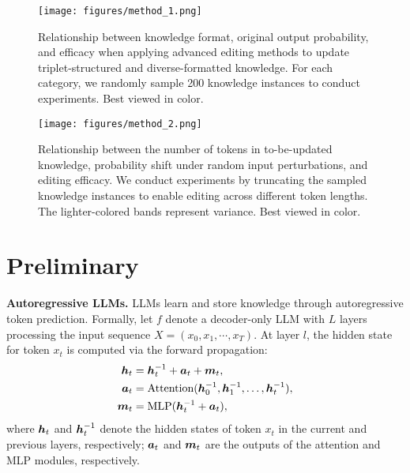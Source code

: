 
\begin{figure*}[t]
    \centering
    \begin{minipage}[t]{0.47\textwidth}
        \centering
        \texttt{[image: figures/method\_1.png]}
        \vspace{-10pt}
        \caption{Relationship between knowledge format, original output probability, and efficacy when applying advanced editing methods to update triplet-structured and diverse-formatted knowledge. For each category, we randomly sample 200 knowledge instances to conduct experiments. Best viewed in color.}
        \label{fig:method1}
        \vspace{-10pt}
    \end{minipage}%
    \hfill
    \begin{minipage}[t]{0.473\textwidth}
        \centering
        \texttt{[image: figures/method\_2.png]}
        \vspace{-10pt}
        \caption{Relationship between the number of tokens in to-be-updated knowledge, probability shift under random input perturbations, and editing efficacy. We conduct experiments by truncating the sampled knowledge instances to enable editing across different token lengths. The lighter-colored bands represent variance. Best viewed in color.}
        \label{fig:method2}
        \vspace{-10pt}
    \end{minipage}
\end{figure*}

\section{Preliminary} \label{sec:method:pre}
\textbf{Autoregressive LLMs.}
LLMs learn and store knowledge through autoregressive token prediction.
Formally, let $f$ denote a decoder-only LLM with $L$ layers processing the input sequence $X=(x_0,x_1,\cdots,x_T)$.
At layer $l$, the hidden state for token $x_t$ is computed via the forward propagation:
\begin{equation}
    \begin{aligned}
         {\bm{h}}_t &= {\bm{h}}_t^{ - 1} + {\bm{a}}_t + {\bm{m}}_t, \\
         {\bm{a}}_t &= \text{Attention}({\bm{h}}_0^{ - 1}, {\bm{h}}_1^{ - 1}, \ldots, {\bm{h}}_t^{ - 1}), \\
         {\bm{m}}_t &= \text{MLP}({\bm{h}}_t^{ - 1} + {\bm{a}}_t),
    \end{aligned}
\end{equation}
where ${\bm{h}}_t$ and ${\bm{h}}_t^{ - 1}$ denote the hidden states of token $x_t$ in the current and previous layers, respectively; ${\bm{a}}_t$ and ${\bm{m}}_t$ are the outputs of the attention and MLP modules, respectively. 


